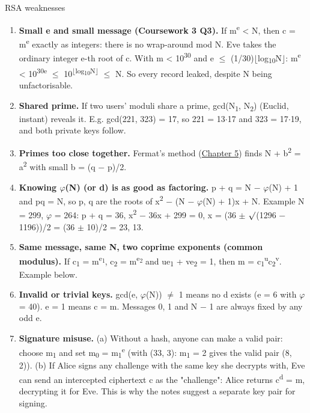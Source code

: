 \documentclass[11pt,a4paper]{article}
\begin{document}
\begin{concept}{RSA weaknesses}
\begin{enumerate}
\item \textbf{Small e and small message (Coursework 3 Q3).} If m\textsuperscript{e} < N, then c = m\textsuperscript{e} exactly as integers: there is no wrap-around mod N. Eve takes the ordinary integer e-th root of c. With m < 10\textsuperscript{30} and e \ensuremath{\le} (1/30)\ensuremath{\lfloor}log\textsubscript{10}N\ensuremath{\rfloor}: m\textsuperscript{e} < 10\textsuperscript{30e} \ensuremath{\le} 10\textsuperscript{\ensuremath{\lfloor}log\textsubscript{10}N\ensuremath{\rfloor}} \ensuremath{\le} N. So every record leaked, despite N being unfactorisable.
\item \textbf{Shared prime.} If two users' moduli share a prime, gcd(N\textsubscript{1}, N\textsubscript{2}) (Euclid, instant) reveals it. E.g. gcd(221, 323) = 17, so 221 = 13\ensuremath{\cdot}17 and 323 = 17\ensuremath{\cdot}19, and both private keys follow.
\item \textbf{Primes too close together.} Fermat's method (\hyperref[ch5]{Chapter 5}) finds N + b\textsuperscript{2} = a\textsuperscript{2} with small b = (q \ensuremath{-} p)/2.
\item \textbf{Knowing \ensuremath{\varphi}(N) (or d) is as good as factoring.} p + q = N \ensuremath{-} \ensuremath{\varphi}(N) + 1 and pq = N, so p, q are the roots of x\textsuperscript{2} \ensuremath{-} (N \ensuremath{-} \ensuremath{\varphi}(N) + 1)x + N. Example N = 299, \ensuremath{\varphi} = 264: p + q = 36, x\textsuperscript{2} \ensuremath{-} 36x + 299 = 0, x = (36 \ensuremath{\pm} \ensuremath{\surd}(1296 \ensuremath{-} 1196))/2 = (36 \ensuremath{\pm} 10)/2 = 23, 13.
\item \textbf{Same message, same N, two coprime exponents (common modulus).} If c\textsubscript{1} = m\textsuperscript{e\textsubscript{1}}, c\textsubscript{2} = m\textsuperscript{e\textsubscript{2}} and ue\textsubscript{1} + ve\textsubscript{2} = 1, then m = c\textsubscript{1}\textsuperscript{u}c\textsubscript{2}\textsuperscript{v}. Example below.
\item \textbf{Invalid or trivial keys.} gcd(e, \ensuremath{\varphi}(N)) \ensuremath{\neq} 1 means no d exists (e = 6 with \ensuremath{\varphi} = 40). e = 1 means c = m. Messages 0, 1 and N \ensuremath{-} 1 are always fixed by any odd e.
\item \textbf{Signature misuse.} (a) Without a hash, anyone can make a valid pair: choose m\textsubscript{1} and set m\textsubscript{0} = m\textsubscript{1}\textsuperscript{e} (with (33, 3): m\textsubscript{1} = 2 gives the valid pair (8, 2)). (b) If Alice signs any challenge with the same key she decrypts with, Eve can send an intercepted ciphertext c as the "challenge": Alice returns c\textsuperscript{d} = m, decrypting it for Eve. This is why the notes suggest a separate key pair for signing.
\end{enumerate}
\end{concept}
\end{document}
